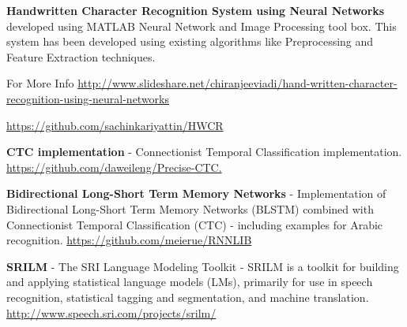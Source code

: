 \textbf{Handwritten Character Recognition System using Neural Networks} developed using MATLAB Neural Network and Image Processing tool box. This system has been developed using existing algorithms like Preprocessing and Feature Extraction techniques.

For More Info \url{http://www.slideshare.net/chiranjeeviadi/hand-written-character-recognition-using-neural-networks}

\url{https://github.com/sachinkariyattin/HWCR}


\textbf{CTC implementation} - Connectionist Temporal Classification implementation. \url{https://github.com/daweileng/Precise-CTC.}

\textbf{Bidirectional Long-Short Term Memory Networks} - Implementation of Bidirectional Long-Short Term Memory Networks (BLSTM) combined with Connectionist Temporal Classification (CTC) - including examples for Arabic recognition. \url{https://github.com/meierue/RNNLIB}

\textbf{SRILM} - The SRI Language Modeling Toolkit - SRILM is a toolkit for building and applying statistical language models (LMs), primarily for use in speech recognition, statistical tagging and segmentation, and machine translation. \url{http://www.speech.sri.com/projects/srilm/}


